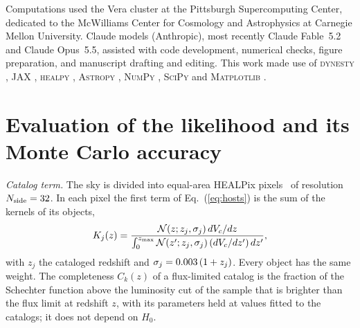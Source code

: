 \documentclass[aps,prd,reprint,twocolumn,superscriptaddress,nofootinbib,floatfix,nolongbibliography]{revtex4-2}
\begin{document}
\begin{acknowledgments}
Computations used the
Vera cluster at the Pittsburgh Supercomputing Center, dedicated to the
McWilliams Center for Cosmology and Astrophysics at Carnegie Mellon
University. Claude models (Anthropic), most recently Claude Fable~5.2 and
Claude Opus~5.5, assisted with code development, numerical checks, figure
preparation, and manuscript drafting and editing. This work made use of
\textsc{dynesty} \cite{Speagle:2019ivv}, \textsc{JAX}
\cite{Bradbury:2018JAX}, \textsc{healpy} \cite{Zonca:2019vzt,Gorski:2004by},
\textsc{Astropy} \cite{Astropy:2022ucr}, \textsc{NumPy}
\cite{Harris:2020xlr}, \textsc{SciPy} \cite{Virtanen:2019joe} and
\textsc{Matplotlib} \cite{Hunter:2007ouj}.
\end{acknowledgments}

\appendix

\section{Evaluation of the likelihood and its Monte Carlo accuracy}
\label{app:like}

\textit{Catalog term.} The sky is divided into equal-area HEALPix pixels~\cite{Gorski:2004by} of
resolution $N_{\rm side}=32$. In each pixel the first term of
Eq.~(\ref{eq:hosts}) is the sum of the kernels of its objects,
\begin{equation}
K_j(z)=\frac{\mathcal{N}(z;z_j,\sigma_j)\,dV_c/dz}
{\int_0^{z_{\rm max}}\mathcal{N}(z';z_j,\sigma_j)\,(dV_c/dz')\,dz'} ,
\label{eq:kernel}
\end{equation}
with $z_j$ the cataloged redshift and $\sigma_j=0.003\,(1+z_j)$. Every
object has the same weight. The completeness $C_k(z)$ of a flux-limited
catalog is the fraction of the Schechter function above the luminosity cut
of the sample that is brighter than the flux limit at redshift $z$, with its
parameters held at values fitted to the catalogs; it does not depend on
$H_0$.
\end{document}
